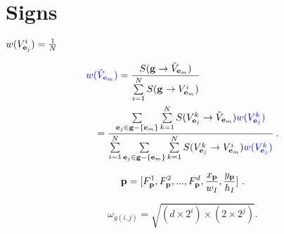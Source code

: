 \chapter{Signs}

$w({V_{{\bf{e}}_j}^i})=\frac 1 N$

\begin{equation}
\begin{aligned}
{\color{blue}w(}&{\color{blue}{\tilde{V}}_{{\bf{e}}_m})}
= \frac
{S({\bf{g}} \to {{\tilde{V}}_{{\bf{e}}_m}}) }
{\sum\limits^N_{i=1}{ S({\bf{g}} \to {V^i_{{{\bf{e}}_m}}})}  }\\
&
\begin{aligned}
= \frac
{ \sum\limits_{{{\bf{e}}_j} \in {\bf{g}}- \{ {{\bf{e}}_m} \}} {
\sum\limits^N_{k=1} {S({{V^k_{{{\bf{e}}_j}}} \to {{\tilde{V}}_{{{\bf{e}}_m}}}})\color{blue}{w(V^k_{{\bf{e}}_j})}}
}   }
{\sum\limits^N_{i=1}{
\sum\limits_{{{\bf{e}}_j} \in {\bf{g}}- \{ {{\bf{e}}_m} \}} {
\sum\limits^N_{k=1} {S({{V^k_{{{\bf{e}}_j}}} \to {V^i_{{{\bf{e}}_m}}}})\color{blue}{w(V^k_{{\bf{e}}_j})}}
}
}  }\:.
\end{aligned}
\end{aligned}
\label{eq4}
\end{equation}

\[
{\bf{p}}=[F_{\bf{p}}^1,F_{\bf{p}}^2,...,F_{\bf{p}}^{d},\frac {x_{\bf{p}}} {w_I} , \frac {y_{\bf{p}}} {h_I}]\ .
\]

\begin{equation}
\label{eq:pms4}
\omega_{g(i,j)}=\sqrt{ (d\times{2^i})\times(2 \times {2^j})  }.
\end{equation}
